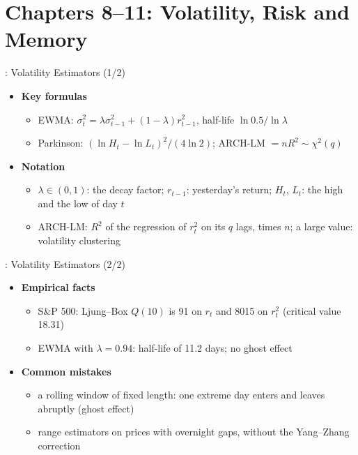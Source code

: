 \section{Chapters 8--11: Volatility, Risk and Memory}

\begin{frame}{: Volatility Estimators (1/2)}
\itemsize{\small}
\begin{itemize}
    \item \textbf{Key formulas}
    \begin{itemize}
        \item EWMA: $\sigma_t^2 = \lambda\sigma_{t-1}^2 + (1 - \lambda)r_{t-1}^2$, half-life $\ln 0.5/\ln\lambda$ 
        \item Parkinson: $(\ln H_t - \ln L_t)^2/(4\ln 2)$; ARCH-LM $= nR^2 \sim \chi^2(q)$
    \end{itemize}
    \item \textbf{Notation}
    \begin{itemize}
        \item $\lambda \in (0, 1)$: the decay factor; $r_{t-1}$: yesterday's return; $H_t$, $L_t$: the high and the low of day $t$
        \item ARCH-LM: $R^2$ of the regression of $r_t^2$ on its $q$ lags, times $n$; a large value: volatility clustering
    \end{itemize}
\end{itemize}
\end{frame}

\begin{frame}{: Volatility Estimators (2/2)}
\itemsize{\small}
\begin{itemize}
    \item \textbf{Empirical facts}
    \begin{itemize}
        \item S\&P 500: Ljung--Box $Q(10)$ is 91 on $r_t$ and 8015 on $r_t^2$ (critical value 18.31)
        \item EWMA with $\lambda = 0.94$: half-life of 11.2 days; no ghost effect
    \end{itemize}
    \item \textbf{Common mistakes}
    \begin{itemize}
        \item a rolling window of fixed length: one extreme day enters and leaves abruptly (ghost effect)
        \item range estimators on prices with overnight gaps, without the Yang--Zhang correction
    \end{itemize}
\end{itemize}
\end{frame}

